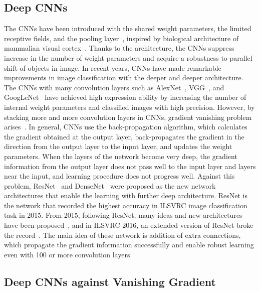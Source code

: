 \documentclass[journal]{IEEEtran}
\begin{document}
\subsection{Deep CNNs}
The CNNs have been introduced with the shared weight parameters, the limited receptive fields, and the pooling layer~\cite{LeCun1989}, inspired by biological architecture of mammalian visual cortex~\cite{Hubel1968,Fukushima1980}.
Thanks to the architecture, the CNNs suppress increase in the number of weight parameters and acquire a robustness to parallel shift of objects in image.
In recent years, CNNs have made remarkable improvements in image classification with the deeper and deeper architecture.
The CNNs with many convolution layers such as AlexNet~\cite{Krizhevsky2012}, VGG~\cite{Simonyan2015a}, and GoogLeNet~\cite{Szegedy2014} have achieved high expression ability by increasing the number of internal weight parameters and classified images with high precision.
However, by stacking more and more convolution layers in CNNs, gradient vanishing problem arises~\cite{Schmidhuber2015}.
In general, CNNs use the back-propagation algorithm, which calculates the gradient obtained at the output layer, back-propagates the gradient in the direction from the output layer to the input layer, and updates the weight parameters.
When the layers of the network become very deep, the gradient information from the output layer does not pass well to the input layer and layers near the input, and learning procedure does not progress well.
Against this problem, ResNet~\cite{He2017} and DenseNet~\cite{Huang2016b} were proposed as the new network architectures that enable the learning with further deep architecture.
ResNet is the network that recorded the highest accuracy in ILSVRC image classification task in 2015.
From 2015, following ResNet, many ideas and new architectures have been proposed~\cite{He2016b,Zagoruyko2016,Huang2016a,Targ2016a,Han2016}, and in ILSVRC 2016, an extended version of ResNet broke the record~\cite{Zagoruyko2016}.
The main idea of these network is addition of extra connections, which propagate the gradient information successfully and enable robust learning even with 100 or more convolution layers.

\subsection{Deep CNNs against Vanishing Gradient}
\end{document}
